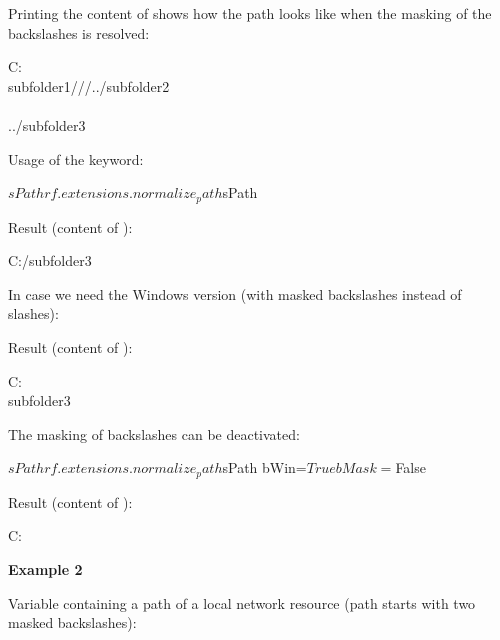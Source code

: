 Printing the content of  shows how the path looks like when the masking of the backslashes is resolved:

\begin{robotlog}
C:\\subfolder1///../subfolder2\\\\../subfolder3\\
\end{robotlog}

Usage of the  keyword:

\begin{robotcode}
${sPath}    rf.extensions.normalize_path    ${sPath}
\end{robotcode}

Result (content of ):

\begin{robotlog}
C:/subfolder3
\end{robotlog}

In case we need the Windows version (with masked backslashes instead of slashes):


Result (content of ):

\begin{robotlog}
C:\\subfolder3
\end{robotlog}

The masking of backslashes can be deactivated:

\begin{robotcode}
${sPath}    rf.extensions.normalize_path    ${sPath}    bWin=${True}    bMask=${False}
\end{robotcode}

Result (content of ):

\begin{robotlog}
C:
\end{robotlog}

\vspace{1ex}

\textbf{Example 2}

\vspace{1ex}

Variable containing a path of a local network resource (path starts with two masked backslashes):

